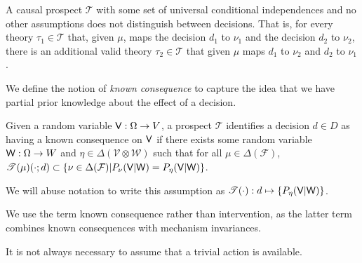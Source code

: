A causal prospect $\mathscr{T}$ with some set of universal conditional independences and no other assumptions does not distinguish between decisions. That is, for every theory $\tau_1\in\mathscr{T}$ that, given $\mu$, maps the decision $d_1$ to $\nu_1$ and the decision $d_2$ to $\nu_2$, there is an additional valid theory $\tau_2\in\mathscr{T}$ that given $\mu$ maps $d_1$ to $\nu_2$ and $d_2$ to $\nu_1$. 

We define the notion of \emph{known consequence} to capture the idea that we have partial prior knowledge about the effect of a decision.

\begin{definition}
Given a random variable $\mathsf{V}:\Omega\to V$, a prospect $\mathscr{T}$ identifies a decision $d\in D$ as having a known consequence on $\mathsf{V}$ if there exists some random variable $\mathsf{W}:\Omega\to W$ and $\eta\in \Delta(\mathcal{V}\otimes \mathcal{W})$ such that for all $\mu\in\Delta(\mathcal{F})$, $\mathscr{T}(\mu)(\cdot;d)\subset\{\nu\in\Delta(\mathcal{F})|P_\nu(\mathsf{V}|\mathsf{W})=P_\eta(\mathsf{V}|\mathsf{W})\}$.

We will abuse notation to write this assumption as $\mathscr{T}(\cdot):d\mapsto \{P_\eta(\mathsf{V}|\mathsf{W})\}$.
\end{definition}

We use the term known consequence rather than intervention, as the latter term combines known consequences with mechanism invariances.

It is not always necessary to assume that a trivial action is available.